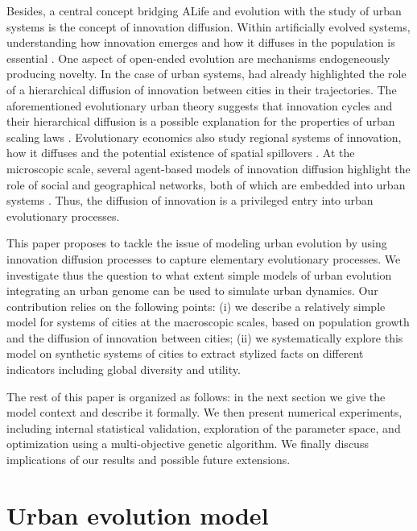 \documentclass[letterpaper]{article}
\begin{document}
Besides, a central concept bridging ALife and evolution with the study of urban systems is the concept of innovation diffusion. Within artificially evolved systems, understanding how innovation emerges and how it diffuses in the population is essential \citep{bedau2000open}. One aspect of open-ended evolution are mechanisms endogeneously producing novelty. In the case of urban systems, \cite{hagerstrand1968innovation} had already highlighted the role of a hierarchical diffusion of innovation between cities in their trajectories. The aforementioned evolutionary urban theory suggests that innovation cycles and their hierarchical diffusion is a possible explanation for the properties of urban scaling laws \citep{pumain2006evolutionary}. Evolutionary economics also study regional systems of innovation, how it diffuses and the potential existence of spatial spillovers \citep{uyarra2010evolutionary}. At the microscopic scale, several agent-based models of innovation diffusion highlight the role of social and geographical networks, both of which are embedded into urban systems \citep{zhang2019empirically}. Thus, the diffusion of innovation is a privileged entry into urban evolutionary processes.



This paper proposes to tackle the issue of modeling urban evolution by using innovation diffusion processes to capture elementary evolutionary processes. We investigate thus the question to what extent simple models of urban evolution integrating an urban genome can be used to simulate urban dynamics. Our contribution relies on the following points: (i) we describe a relatively simple model for systems of cities at the macroscopic scales, based on population growth and the diffusion of innovation between cities; (ii) we systematically explore this model on synthetic systems of cities to extract stylized facts on different indicators including global diversity and utility.

The rest of this paper is organized as follows: in the next section we give the model context and describe it formally. We then present numerical experiments, including internal statistical validation, exploration of the parameter space, and optimization using a multi-objective genetic algorithm. We finally discuss implications of our results and possible future extensions.



\section{Urban evolution model}
\end{document}
